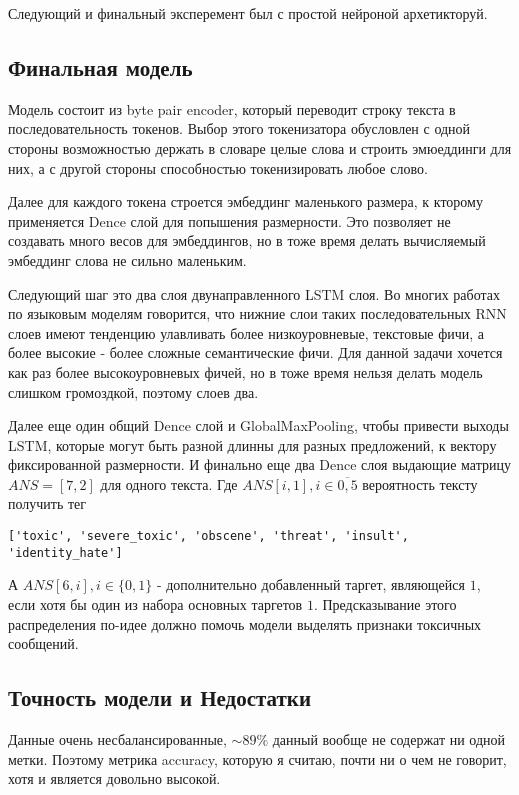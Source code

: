 \documentclass[13pt,a4paper]{article}
\theoremstyle{remark}
\begin{document}
	
	Следующий и финальный эксперемент был с простой нейроной архетикторуй.
	
	\subsection*{Финальная модель}
	
	Модель состоит из byte pair encoder, который переводит строку текста в последовательность токенов. Выбор этого токенизатора обусловлен с одной стороны возможностью держать в словаре целые слова и строить эмюеддинги для них, а с другой стороны способностью токенизировать любое слово.
	
	Далее для каждого токена строется эмбеддинг маленького размера, к кторому применяется Dence слой для попышения размерности. Это позволяет не создавать много весов для эмбеддингов, но в тоже время делать вычисляемый эмбеддинг слова не сильно маленьким.
	
	Следующий шаг это два слоя двунаправленного LSTM слоя. Во многих работах по языковым моделям говорится, что нижние слои таких последовательных RNN слоев имеют тенденцию улавливать более низкоуровневые, текстовые фичи, а более высокие - более сложные семантические фичи. Для данной задачи хочется как раз более высокоуровневых фичей, но в тоже время нельзя делать модель слишком громоздкой, поэтому слоев два.
	
	Далее еще один общий Dence слой и GlobalMaxPooling, чтобы привести выходы LSTM, которые могут быть разной длинны для разных предложений, к вектору фиксированной размерности. И финально еще два Dence слоя выдающие матрицу $ANS = [7, 2]$ для одного текста. Где $ANS[i, 1], i \in \overline{0, 5}$ вероятность тексту получить тег 
	
	\verb|['toxic', 'severe_toxic', 'obscene', 'threat', 'insult', 'identity_hate']|
	
	А $ANS[6, i], i\in \{0, 1\}$ - дополнительно добавленный таргет, являющейся $1$, если хотя бы один из набора основных таргетов $1$. Предсказывание этого распределения по-идее должно помочь модели выделять признаки токсичных сообщений.


	\subsection*{Точность модели и Недостатки}
	
	Данные очень несбалансированные, $\sim 89 \%$ данный вообще не содержат ни одной метки. Поэтому метрика  accuracy, которую я считаю, почти ни о чем не говорит, хотя и является довольно высокой.
	
\end{document}
